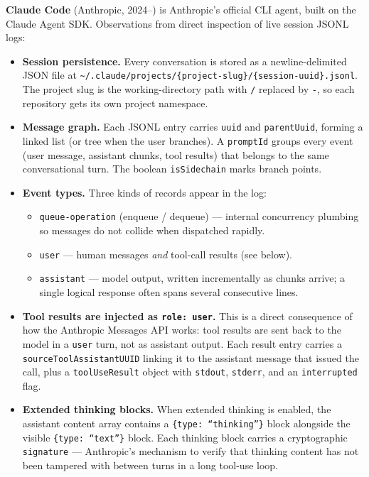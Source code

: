\textbf{Claude Code} (Anthropic, 2024--) is Anthropic's official CLI agent, built on the
Claude Agent SDK. Observations from direct inspection of live session JSONL logs:

\begin{itemize}
  \item \textbf{Session persistence.} Every conversation is stored as a newline-delimited
    JSON file at \texttt{\textasciitilde/.claude/projects/\{project-slug\}/\{session-uuid\}.jsonl}.
    The project slug is the working-directory path with \texttt{/} replaced by \texttt{-},
    so each repository gets its own project namespace.

  \item \textbf{Message graph.} Each JSONL entry carries \texttt{uuid} and \texttt{parentUuid},
    forming a linked list (or tree when the user branches). A \texttt{promptId} groups every
    event (user message, assistant chunks, tool results) that belongs to the same conversational
    turn. The boolean \texttt{isSidechain} marks branch points.

  \item \textbf{Event types.} Three kinds of records appear in the log:
    \begin{itemize}
      \item \texttt{queue-operation} (enqueue / dequeue) --- internal concurrency plumbing
        so messages do not collide when dispatched rapidly.
      \item \texttt{user} --- human messages \emph{and} tool-call results (see below).
      \item \texttt{assistant} --- model output, written incrementally as chunks arrive;
        a single logical response often spans several consecutive lines.
    \end{itemize}

  \item \textbf{Tool results are injected as \texttt{role: user}.} This is a direct
    consequence of how the Anthropic Messages API works: tool results are sent back to
    the model in a \texttt{user} turn, not as assistant output. Each result entry carries
    a \texttt{sourceToolAssistantUUID} linking it to the assistant message that issued
    the call, plus a \texttt{toolUseResult} object with \texttt{stdout}, \texttt{stderr},
    and an \texttt{interrupted} flag.

  \item \textbf{Extended thinking blocks.} When extended thinking is enabled, the
    assistant content array contains a \texttt{\{type: ``thinking''\}} block alongside
    the visible \texttt{\{type: ``text''\}} block. Each thinking block carries a
    cryptographic \texttt{signature} --- Anthropic's mechanism to verify that thinking
    content has not been tampered with between turns in a long tool-use loop.


\end{itemize}
